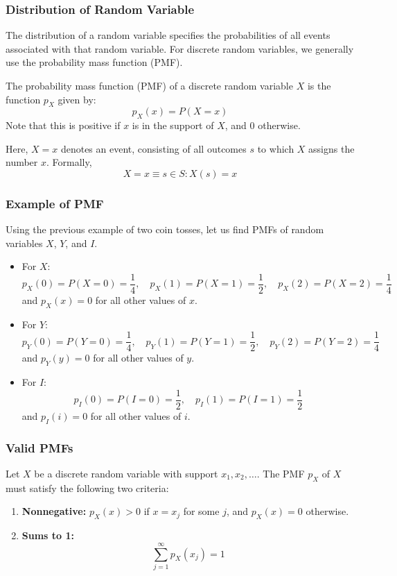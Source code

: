 \documentclass{beamer}
\begin{document}
\begin{frame}
    \frametitle{Distribution of Random Variable}
    The distribution of a random variable specifies the probabilities of all events associated with that random variable. For discrete random variables, we generally use the probability mass function (PMF).

    The probability mass function (PMF) of a discrete random variable $X$ is the function $p_X$ given by:
    $$p_X (x) = P (X = x)$$
    Note that this is positive if $x$ is in the support of $X$, and $0$ otherwise.

    Here, $X = x$ denotes an event, consisting of all outcomes $s$ to which $X$ assigns the number $x$. Formally,
    $${X = x} \equiv {s \in S : X(s) = x}$$
\end{frame}

\begin{frame}
    \frametitle{Example of PMF}
    Using the previous example of two coin tosses, let us find PMFs of random variables $X$, $Y$, and $I$.
    \begin{itemize}
        \item For $X$:
        \[p_X (0) = P (X = 0) = \frac{1}{4}, \quad p_X (1) = P (X = 1) = \frac{1}{2}, \quad p_X (2) = P (X = 2)  = \frac{1}{4}\]
        and $p_X (x) = 0$ for all other values of $x$.
        
        \item For $Y$:
        $$p_Y (0) = P (Y = 0) = \frac{1}{4}, \quad p_Y (1) = P (Y = 1) = \frac{1}{2}, \quad p_Y (2) = P (Y = 2) = \frac{1}{4}$$
        and $p_Y (y) = 0$ for all other values of $y$.
        
        \item For $I$:
        $$p_I (0) = P (I = 0) = \frac{1}{2}, \quad p_I (1) = P (I = 1) = \frac{1}{2}$$
        and $p_I (i) = 0$ for all other values of $i$.
    \end{itemize}
\end{frame}

\begin{frame}
    \frametitle{Valid PMFs}
    Let $X$ be a discrete random variable with support $x_1, x_2, \ldots$. The PMF $p_X$ of $X$ must satisfy the following two criteria:
    \begin{enumerate}
        \item \textbf{Nonnegative:} $p_X (x) > 0$ if $x = x_j$ for some $j$, and $p_X (x) = 0$ otherwise.
        \item \textbf{Sums to 1:} 
        $$\sum_{j=1}^{\infty} p_X(x_j) = 1$$
    \end{enumerate}
\end{frame}
\end{document}
